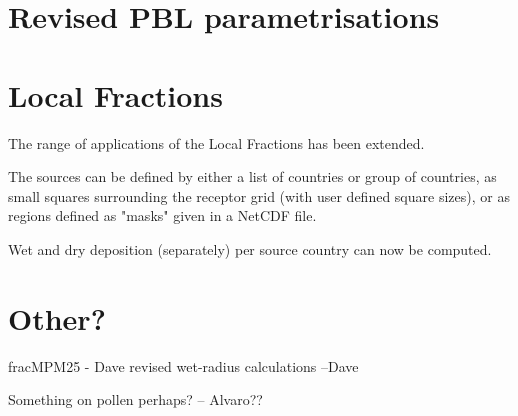 \section{Revised PBL parametrisations}
\label{sec:updateKz}


\section{Local Fractions}
\label{sec:updateLF}
The range of applications of the Local Fractions has been extended. 

The sources can be defined by either a list of countries or group of countries, as small squares surrounding the receptor grid (with user defined square sizes), or as regions defined as "masks" given in a NetCDF file.

Wet and dry deposition (separately) per source country can now be computed.


\section{Other?}
\label{sec:updateOther}

fracMPM25 - Dave
revised wet-radius calculations --Dave

Something on pollen perhaps? -- Alvaro??



\clearpage
\renewcommand\bibname{References}      %


